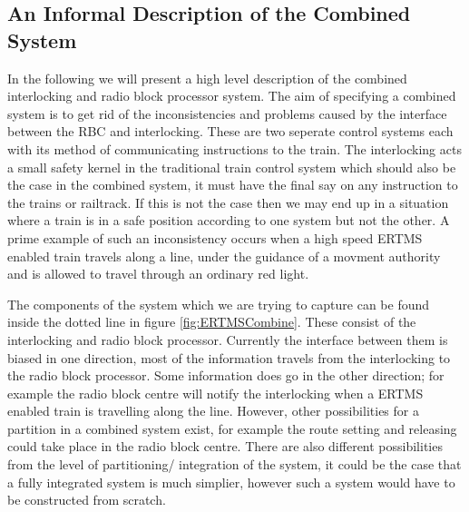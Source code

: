 \subsection*{An Informal Description of the Combined System}
In the following we will present a high level description of the combined interlocking and radio block processor system.
The aim of specifying a combined system is to get rid of the inconsistencies and problems caused by the interface between the RBC and interlocking.  These are two seperate control systems each with its method of communicating instructions to the train. The interlocking acts a small safety kernel in the traditional train control system which should also be the case in the combined system, it must have the final say on any instruction to the trains or railtrack. If this is not the case then we may end up in a situation where a train is in a safe position according to one system but not the other. A prime example of such an inconsistency occurs when a high speed ERTMS enabled train travels along a line, under the guidance of a movment authority and is allowed to travel through an ordinary red light.  

 The components of the system which we are trying to capture can be found inside the dotted line in figure \ref{fig:ERTMSCombine}. These consist of the interlocking and radio block processor. Currently the interface between them is biased in one direction, most of the information travels from the interlocking to the radio block processor. Some information does go in the other direction; for example the radio block centre will notify the interlocking when a ERTMS enabled train is travelling along the line.  However, other possibilities for a partition in a combined system exist, for example the route setting and releasing could take place in the radio block centre. There are also different possibilities from the level of partitioning/ integration of the system, it could be the case that a fully integrated system is much simplier, however such a system would have to be constructed from scratch. 



